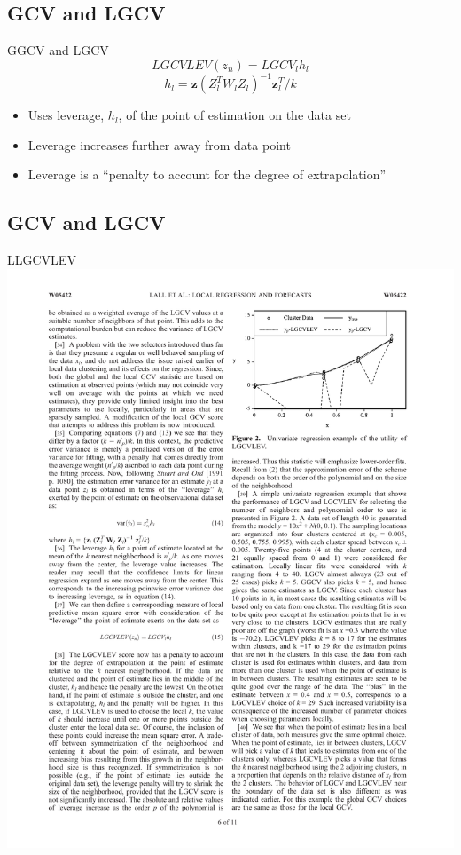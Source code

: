 \documentclass[xcolor=x11names,compress]{beamer}
\renewcommand{\(}{\begin{columns}}
\renewcommand{\)}{\end{columns}}
\newcommand{\<}[1]{\begin{column}{#1}}
\renewcommand{\>}{\end{column}}
\begin{document}
\subsection{GCV and LGCV}
\begin{frame}{GGCV and LGCV}
$$LGCVLEV(z_n)=LGCV_lh_l$$
$$h_l=\mathbf{z}(Z_l^TW_lZ_l)^{-1}\mathbf{z}_l^T/k$$

\begin{itemize}
	\item Uses leverage, $h_l$, of the point of estimation on the data set
	\item Leverage increases further away from data point
	\item Leverage is a ``penalty to account for the degree of extrapolation''
\end{itemize}
\end{frame}

\subsection{GCV and LGCV}
\begin{frame}{LLGCVLEV}
\centering
\includegraphics[width=.7\textwidth]{LGCVLEV.pdf}
\end{frame}


\end{document}

